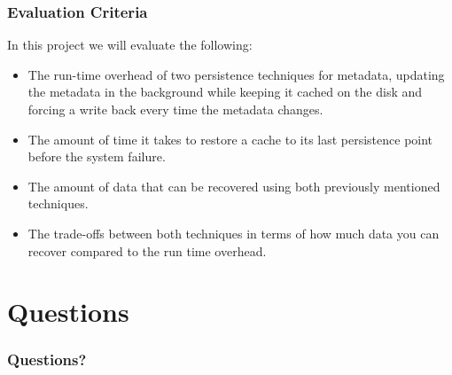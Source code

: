 \documentclass{beamer}
\begin{document}
\begin{frame}
  \frametitle{Evaluation Criteria}

  In this project we will evaluate the following:
  \begin{itemize}
    \item The run-time overhead of two persistence techniques for
    metadata, updating the metadata in the background while keeping it
    cached on the disk and forcing a write back every time the
    metadata changes.
    \item The amount of time it takes to restore a cache to its last
    persistence point before the system failure.
    \item The amount of data that can be recovered using both
    previously mentioned techniques.
    \item The trade-offs between both techniques in terms of how much
    data you can recover compared to the run time overhead.
  \end{itemize}

\end{frame}


\section{Questions}

\begin{frame}
  \frametitle{Questions?}
\end{frame}

\end{document}
